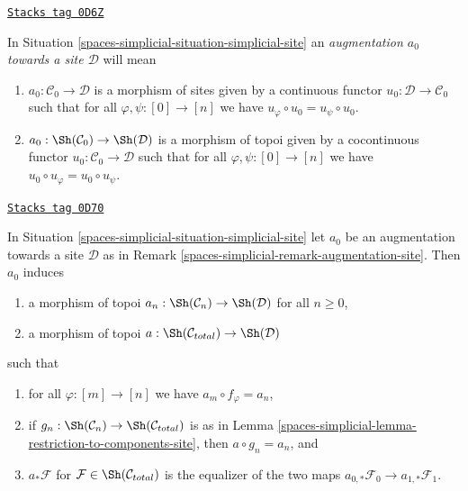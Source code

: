 \begin{remark}
\label{spaces-simplicial-remark-augmentation-site}
\href{https://stacks.math.columbia.edu/tag/0D6Z}{\texttt{Stacks tag 0D6Z}}

In Situation \ref{spaces-simplicial-situation-simplicial-site} an
{\it augmentation $a_0$ towards a site $\mathcal{D}$} will mean
\begin{enumerate}
\item[(A)] $a_0 : \mathcal{C}_0 \to \mathcal{D}$ is a morphism of sites
given by a continuous functor $u_0 : \mathcal{D} \to \mathcal{C}_0$
such that for all $\varphi, \psi : [0] \to [n]$ we have
$u_\varphi \circ u_0 = u_\psi \circ u_0$.
\item[(B)] $a_0 : \Sh(\mathcal{C}_0) \to \Sh(\mathcal{D})$ is a morphism
of topoi given by a cocontinuous functor $u_0 : \mathcal{C}_0 \to \mathcal{D}$
such that for all $\varphi, \psi : [0] \to [n]$ we have
$u_0 \circ u_\varphi = u_0 \circ u_\psi$.
\end{enumerate}
\end{remark}

\begin{lemma}
\label{spaces-simplicial-lemma-augmentation-site}
\href{https://stacks.math.columbia.edu/tag/0D70}{\texttt{Stacks tag 0D70}}

In Situation \ref{spaces-simplicial-situation-simplicial-site} let $a_0$ be an
augmentation towards a site $\mathcal{D}$ as in
Remark \ref{spaces-simplicial-remark-augmentation-site}. Then $a_0$ induces
\begin{enumerate}
\item a morphism of topoi $a_n : \Sh(\mathcal{C}_n) \to \Sh(\mathcal{D})$
for all $n \geq 0$,
\item a morphism of topoi $a : \Sh(\mathcal{C}_{total}) \to \Sh(\mathcal{D})$
\end{enumerate}
such that
\begin{enumerate}
\item for all $\varphi : [m] \to [n]$ we have $a_m \circ f_\varphi = a_n$,
\item if $g_n : \Sh(\mathcal{C}_n) \to \Sh(\mathcal{C}_{total})$
is as in Lemma \ref{spaces-simplicial-lemma-restriction-to-components-site}, then
$a \circ g_n = a_n$, and
\item $a_*\mathcal{F}$ for $\mathcal{F} \in \Sh(\mathcal{C}_{total})$
is the equalizer of the two maps
$a_{0, *}\mathcal{F}_0 \to a_{1, *}\mathcal{F}_1$.
\end{enumerate}
\end{lemma}

